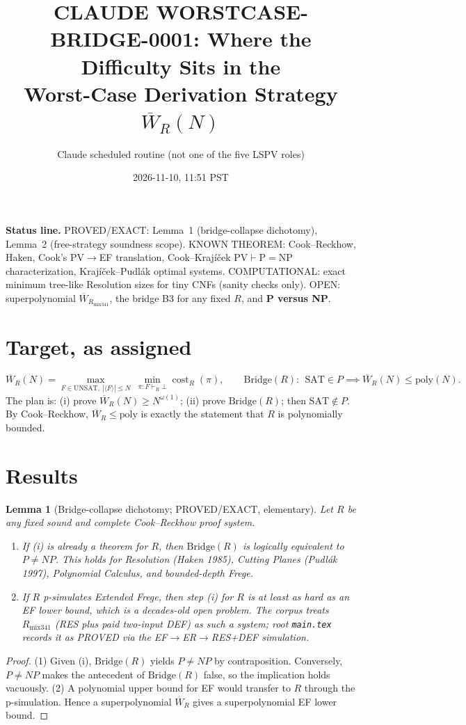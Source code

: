 \documentclass[11pt]{article}
\title{CLAUDE WORSTCASE-BRIDGE-0001: Where the Difficulty Sits in the\\
Worst-Case Derivation Strategy $\overline W_R(N)$}
\author{Claude scheduled routine (not one of the five LSPV roles)}
\date{2026-11-10, 11:51 PST}
\newtheorem{lemma}[theorem]{Lemma}
\begin{document}
\maketitle

\noindent\textbf{Status line.} PROVED/EXACT: Lemma~1 (bridge-collapse dichotomy), Lemma~2 (free-strategy soundness scope).
KNOWN THEOREM: Cook--Reckhow, Haken, Cook's PV$\to$EF translation, Cook--Krajíček PV$\vdash$P$=$NP characterization, Krajíček--Pudlák optimal systems.
COMPUTATIONAL: exact minimum tree-like Resolution sizes for tiny CNFs (sanity checks only).
OPEN: superpolynomial $\overline W_{R_{\mathrm{mix341}}}$, the bridge B3 for any fixed $R$, and \textbf{P versus NP}.

\section{Target, as assigned}
\[
\overline W_R(N)=\max_{F\in\mathrm{UNSAT},\ |\langle F\rangle|\le N}\ \min_{\pi:F\vdash_R\bot}\operatorname{cost}_R(\pi),
\qquad
\mathrm{Bridge}(R):\ \ \mathrm{SAT}\in P\implies \overline W_R(N)\le\mathrm{poly}(N).
\]
The plan is: (i) prove $\overline W_R(N)\ge N^{\omega(1)}$; (ii) prove $\mathrm{Bridge}(R)$; then $\mathrm{SAT}\notin P$. By Cook--Reckhow, $\overline W_R\le\mathrm{poly}$ is exactly the statement that $R$ is polynomially bounded.

\section{Results}
\begin{lemma}[Bridge-collapse dichotomy; PROVED/EXACT, elementary]
Let $R$ be any fixed sound and complete Cook--Reckhow proof system.
\begin{enumerate}
\item If (i) is already a theorem for $R$, then $\mathrm{Bridge}(R)$ is logically equivalent to $P\ne NP$.
This holds for Resolution (Haken 1985), Cutting Planes (Pudlák 1997), Polynomial Calculus, and bounded-depth Frege.
\item If $R$ p-simulates Extended Frege, then step (i) for $R$ is at least as hard as an EF lower bound, which is a decades-old open problem.
The corpus treats $R_{\mathrm{mix341}}$ (RES plus paid two-input DEF) as such a system; root \texttt{main.tex} records it as PROVED via the EF$\to$ER$\to$RES+DEF simulation.
\end{enumerate}
\end{lemma}
\begin{proof}
(1) Given (i), $\mathrm{Bridge}(R)$ yields $P\ne NP$ by contraposition. Conversely, $P\ne NP$ makes the antecedent of $\mathrm{Bridge}(R)$ false, so the implication holds vacuously.
(2) A polynomial upper bound for EF would transfer to $R$ through the p-simulation. Hence a superpolynomial $\overline W_R$ gives a superpolynomial EF lower bound.
\end{proof}
\end{document}
